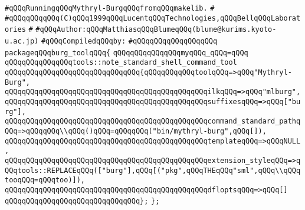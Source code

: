 \label{src/app/makelib/tools/mlburg/tool.pkg}
\verb|#qQQqRunningqQQqMythryl-BurgqQQqfromqQQqmakelib.|\newline
\verb|#|\newline
\verb|#qQQqqQQqqQQq(C)qQQq1999qQQqLucentqQQqTechnologies,qQQqBellqQQqLaboratories|\newline
\verb|#|\newline
\verb|#qQQqAuthor:qQQqMatthiasqQQqBlumeqQQq(blume@kurims.kyoto-u.ac.jp)|\newline
\newline
\verb|#qQQqCompiledqQQqby:|\newline
\verb|#qQQqqQQqqQQqqQQqqQQq|\newline
\newline
\verb|packageqQQqburg_toolqQQq{|\newline
\newline
\verb|qQQqqQQqqQQqqQQqmyqQQq_qQQq=qQQq|\newline
\newline
\verb|qQQqqQQqqQQqqQQqtools::note_standard_shell_command_tool|\newline
\verb|qQQqqQQqqQQqqQQqqQQqqQQqqQQqqQQq{qQQqqQQqqQQqtoolqQQq=>qQQq"Mythryl-Burg",|\newline
\verb|qQQqqQQqqQQqqQQqqQQqqQQqqQQqqQQqqQQqqQQqqQQqqQQqilkqQQq=>qQQq"mlburg",|\newline
\verb|qQQqqQQqqQQqqQQqqQQqqQQqqQQqqQQqqQQqqQQqqQQqqQQqsuffixesqQQq=>qQQq["burg"],|\newline
\verb|qQQqqQQqqQQqqQQqqQQqqQQqqQQqqQQqqQQqqQQqqQQqqQQqcommand_standard_pathqQQq=>qQQqqQQq\\qQQq()qQQq=qQQqqQQq("bin/mythryl-burg",qQQq[]),|\newline
\verb|qQQqqQQqqQQqqQQqqQQqqQQqqQQqqQQqqQQqqQQqqQQqqQQqtemplateqQQq=>qQQqNULL,|\newline
\verb|qQQqqQQqqQQqqQQqqQQqqQQqqQQqqQQqqQQqqQQqqQQqqQQqextension_styleqQQq=>qQQqtools::REPLACEqQQq(["burg"],qQQq[("pkg",qQQqTHEqQQq"sml",qQQq\\qQQqtooqQQq=qQQqtoo)]),|\newline
\verb|qQQqqQQqqQQqqQQqqQQqqQQqqQQqqQQqqQQqqQQqqQQqqQQqdfloptsqQQq=>qQQq[]|\newline
\verb|qQQqqQQqqQQqqQQqqQQqqQQqqQQqqQQq};|\newline
\verb|};|\newline

